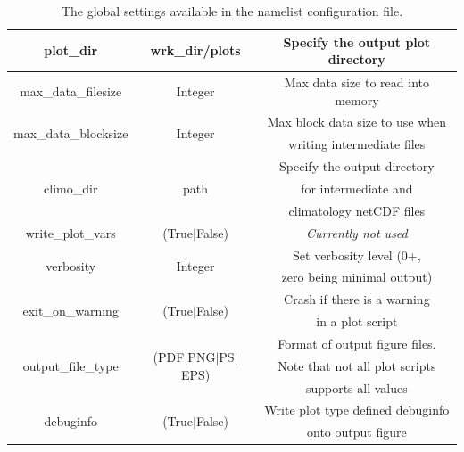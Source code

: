 \documentclass[12pt]{article}
\begin{document}
\begin{table}
\begin{center}
\begin{tabular}{|c|c|c|}
plot\_dir         & wrk\_dir/plots            & Specify the output plot 
                                                       directory\\
\hline
max\_data\_filesize   & Integer & Max data size to read into memory\\ 
\hline
\multirow{2}{*}{max\_data\_blocksize}   & \multirow{2}{*}{Integer} &
Max block data size to use when\\&&
writing intermediate files\\ 
\hline
\multirow{3}{*}{climo\_dir}   &\multirow{3}{*}{path}  &
Specify the output directory\\ &&for intermediate and \\&&climatology netCDF files\\
\hline
write\_plot\_vars & (True$|$False) & \emph{Currently not used} \\
\hline
\multirow{2}{*}{verbosity}   &  \multirow{2}{*}{Integer} & Set verbosity level (0+, \\&&zero being minimal output)\\
\hline
\multirow{2}{*}{exit\_on\_warning} & \multirow{2}{*}{(True$|$False)} &
Crash if there is a warning \\&&in a plot script\\
\hline
\multirow{3}{*}{output\_file\_type} & \multirow{3}{*}{(PDF$|$PNG$|$PS$|$EPS)} &
Format of output figure files.\\&&Note that not all plot scripts \\&&supports all values\\
\hline
\multirow{2}{*}{debuginfo} & \multirow{2}{*}{(True$|$False)} &
Write plot type defined debuginfo\\&&onto output figure\\
\hline
\end{tabular}
\end{center}
\caption{The global settings available in the namelist configuration
file. }\label{table:globalSettings}
\end{table}

\end{document}
